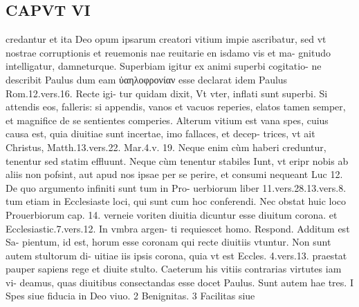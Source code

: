 \documentclass{article}
\begin{document}
\begin{pages}
\section*{CAPVT  VI }
\marginpar{[ p.497 ]}\pstart credantur et ita Deo opum ipsarum creatori vitium impie ascribatur, sed vt nostrae corruptionis et reuemonis nae reuitarie en isdamo vis et ma- gnitudo intelligatur, damneturque.  \pend\pstart Superbiam igitur ex animi superbi cogitatio- ne describit Paulus dum eam ὐαηλοφρονίαν esse declarat idem Paulus Rom.12.vers.16. Recte igi- tur quidam dixit, Vt vter, inflati sunt superbi. Si attendis eos, falleris: si appendis, vanos et vacuos reperies, elatos tamen semper, et magnifice de se sentientes comperies.  \pend\pstart Alterum vitium est vana spes, cuius causa est, quia diuitiae sunt incertae, imo fallaces, et decep- trices, vt ait Christus, Matth.13.vers.22. Mar.4.v. 19. Neque enim cùm haberi creduntur, tenentur sed statim effluunt. Neque cùm tenentur stabiles Iunt, vt eripr nobis ab aliis non pofsint, aut apud nos ipsae per se perire, et consumi nequeant Luc 12. De quo argumento infiniti sunt tum in Pro- uerbiorum liber  11.vers.28.13.vers.8. tum etiam in Ecclesiaste loci, qui sunt cum hoc conferendi.  \pend\pstart Nec obstat huic loco Prouerbiorum cap. 14. verneie voriten diuitia dicuntur esse diuitum corona. et Ecclesiastic.7.vers.12. In vmbra argen- ti requiescet homo. Respond. Additum est Sa- pientum, id est, horum esse coronam qui recte diuitiis vtuntur. Non sunt autem stultorum di- uitiae iis ipsis corona, quia vt est Eccles. 4.vers.13. praestat pauper sapiens rege et diuite stulto.  \pend\pstart Caeterum his vitiis contrarias virtutes iam vi- deamus, quas diuitibus consectandas esse docet Paulus. Sunt autem hae tres. I Spes siue fiducia in Deo viuo. 2 Benignitas. 3 Facilitas siue  \pend

\end{pages}
\end{document}

